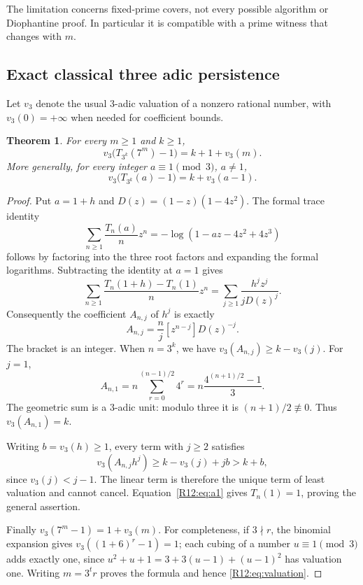 \documentclass[11pt,a4paper]{article}
\newtheorem{theorem}{Theorem}[section]
\theoremstyle{definition}\newtheorem{definition}[theorem]{Definition}
\theoremstyle{remark}\newtheorem{remark}[theorem]{Remark}
\begin{document}
The limitation concerns fixed-prime covers, not every possible
algorithm or Diophantine proof. In particular it is compatible with
a prime witness that changes with $m$.

\subsection{Exact classical three adic persistence}

Let $v_3$ denote the usual $3$-adic valuation of a nonzero rational
number, with $v_3(0)=+\infty$ when needed for coefficient bounds.

\begin{theorem}\label{R12:thm:valuation}
For every $m\ge1$ and $k\ge1$,
\begin{equation}\label{R12:eq:valuation}
 v_3\bigl(T_{3^k}(7^m)-1\bigr)=k+1+v_3(m).
\end{equation}
More generally, for every integer $a\equiv1\pmod3$, $a\ne1$,
\[
 v_3\bigl(T_{3^k}(a)-1\bigr)=k+v_3(a-1).
\]
\end{theorem}
\begin{proof}
Put $a=1+h$ and $D(z)=(1-z)(1-4z^2)$. The formal trace identity
\[
 \sum_{n\ge1}\frac{T_n(a)}n z^n
 =-\log(1-az-4z^2+4z^3)
\]
follows by factoring into the three root factors and expanding the
formal logarithms. Subtracting the identity at $a=1$ gives
\[
 \sum_{n\ge1}\frac{T_n(1+h)-T_n(1)}n z^n
 =\sum_{j\ge1}\frac{h^jz^j}{jD(z)^j}.
\]
Consequently the coefficient $A_{n,j}$ of $h^j$ is exactly
\begin{equation}\label{R12:eq:coeff}
 A_{n,j}=\frac nj[z^{n-j}]D(z)^{-j}.
\end{equation}
The bracket is an integer. When $n=3^k$, we have
$v_3(A_{n,j})\ge k-v_3(j)$. For $j=1$,
\[
 A_{n,1}=n\sum_{r=0}^{(n-1)/2}4^r
 =n\frac{4^{(n+1)/2}-1}{3}.
\]
The geometric sum is a $3$-adic unit: modulo three it is
$(n+1)/2\not\equiv0$. Thus $v_3(A_{n,1})=k$.

Writing $b=v_3(h)\ge1$, every term with $j\ge2$ satisfies
\[
 v_3(A_{n,j}h^j)\ge k-v_3(j)+jb>k+b,
\]
since $v_3(j)<j-1$. The linear term is therefore the unique term
of least valuation and cannot cancel. Equation~\eqref{R12:eq:a1} gives
$T_n(1)=1$, proving the general assertion.

Finally $v_3(7^m-1)=1+v_3(m)$. For completeness, if $3\nmid r$,
the binomial expansion gives $v_3((1+6)^r-1)=1$; each cubing of a
number $u\equiv1\pmod3$ adds exactly one, since
$u^2+u+1=3+3(u-1)+(u-1)^2$ has valuation one. Writing
$m=3^tr$ proves the formula and hence \eqref{R12:eq:valuation}.
\end{proof}
\end{document}
